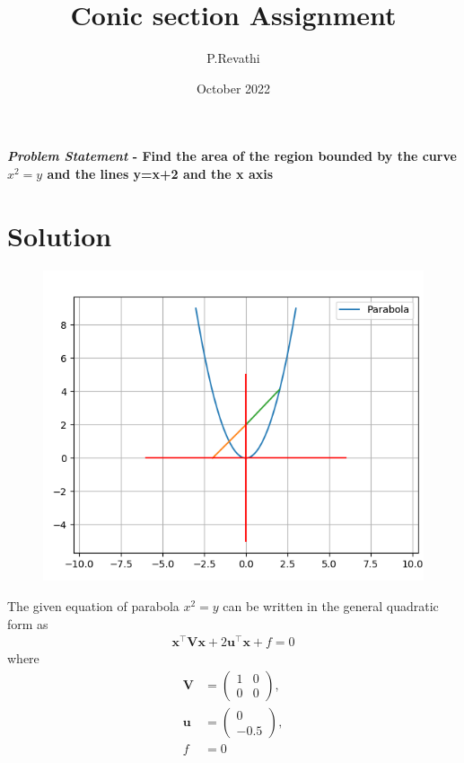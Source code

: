 \documentclass[journal,10pt,twocolumn]{article}
\title{\textbf{Conic section Assignment}}
\author{P.Revathi}
\date{October 2022}
\let\vec\mathbf
\newcommand{\myvec}[1]{\ensuremath{\begin{pmatrix}#1\end{pmatrix}}}
\begin{document}
\maketitle
\paragraph{\textit{Problem Statement} - Find the area of the region bounded by the curve $x^2=y$ and the lines y=x+2 and the x axis }

\section*{\large Solution}

\begin{figure}[h]
\centering
\includegraphics[width=1\columnwidth]{conics1.png}

\label{fig:parabola}
\end{figure}

The given equation of parabola $x^2 = y$ can be written in the general quadratic form as
\begin{align}
    \label{eq:conic_quad_form}
    \vec{x}^{\top}\vec{V}\vec{x}+2\vec{u}^{\top}\vec{x}+f=0
    \end{align}
where
\begin{align}
 \label{eq:V_matrix}
 \vec{V} &= \myvec{1 & 0\\0 & 0},
 \\
 \label{eq:u_vector}
 \vec{u} &= \myvec{0\\-0.5},
 \\
 \label{eq:f_value}
 f &= 0
\end{align}
\end{document}
